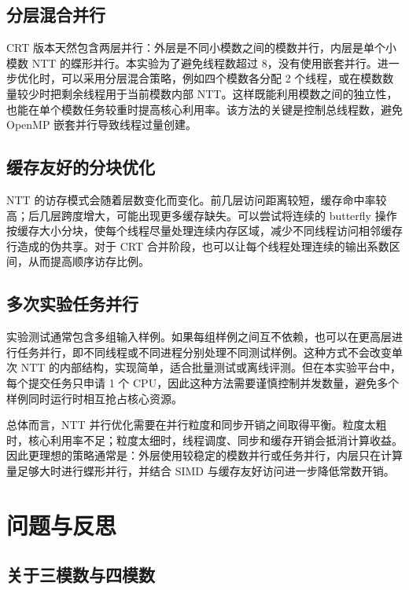 \documentclass[a4paper]{article}
\begin{document}
\subsection{分层混合并行}

CRT 版本天然包含两层并行：外层是不同小模数之间的模数并行，内层是单个小模数 NTT 的蝶形并行。本实验为了避免线程数超过 8，没有使用嵌套并行。进一步优化时，可以采用分层混合策略，例如四个模数各分配 2 个线程，或在模数数量较少时把剩余线程用于当前模数内部 NTT。这样既能利用模数之间的独立性，也能在单个模数任务较重时提高核心利用率。该方法的关键是控制总线程数，避免 OpenMP 嵌套并行导致线程过量创建。

\subsection{缓存友好的分块优化}

NTT 的访存模式会随着层数变化而变化。前几层访问距离较短，缓存命中率较高；后几层跨度增大，可能出现更多缓存缺失。可以尝试将连续的 butterfly 操作按缓存大小分块，使每个线程尽量处理连续内存区域，减少不同线程访问相邻缓存行造成的伪共享。对于 CRT 合并阶段，也可以让每个线程处理连续的输出系数区间，从而提高顺序访存比例。

\subsection{多次实验任务并行}

实验测试通常包含多组输入样例。如果每组样例之间互不依赖，也可以在更高层进行任务并行，即不同线程或不同进程分别处理不同测试样例。这种方式不会改变单次 NTT 的内部结构，实现简单，适合批量测试或离线评测。但在本实验平台中，每个提交任务只申请 1 个 CPU，因此这种方法需要谨慎控制并发数量，避免多个样例同时运行时相互抢占核心资源。

总体而言，NTT 并行优化需要在并行粒度和同步开销之间取得平衡。粒度太粗时，核心利用率不足；粒度太细时，线程调度、同步和缓存开销会抵消计算收益。因此更理想的策略通常是：外层使用较稳定的模数并行或任务并行，内层只在计算量足够大时进行蝶形并行，并结合 SIMD 与缓存友好访问进一步降低常数开销。

\section{问题与反思}

\subsection{关于三模数与四模数}
\end{document}

